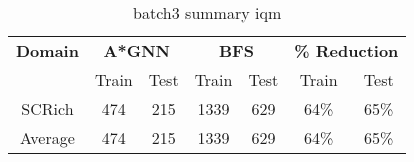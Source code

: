 \begin{table}[!ht]
  \small
  \centering
  \begin{tabular}{c|cc|cc|cc}
    \textbf{Domain}
      & \multicolumn{2}{c|}{\textbf{A*GNN}}
      & \multicolumn{2}{c|}{\textbf{BFS}}
      & \multicolumn{2}{c}{\textbf{\% Reduction}} \\
    \cline{2-7}
    & Train & Test & Train & Test & Train & Test \\
    \hline

    SCRich & 474 & 215 & 1339 & 629 & 64\% & 65\% \\
    \hline
    Average & 474 & 215 & 1339 & 629 & 64\% & 65\% \\

  \end{tabular}
  \caption{batch3 summary iqm}
  \label{tab:batch3_res}
\end{table}
